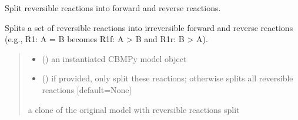 \documentclass[letterpaper,12pt,english]{sphinxmanual}
\begin{document}
\begin{fulllineitems}
\label{\detokenize{api/core:cbmpy.CBTools.splitReversibleReactions}}
\pysigstartsignatures
\pysiglinewithargsret
{}
{\sphinxparamcomma {}}
{}
\pysigstopsignatures
\sphinxAtStartPar
Split reversible reactions into forward and reverse reactions.

\sphinxAtStartPar
Splits a set of reversible reactions into irreversible forward and reverse
reactions (e.g., R1: A = B becomes R1f: A \sphinxhyphen{}\textgreater{} B and R1r: B \sphinxhyphen{}\textgreater{} A).
\begin{quote}\begin{description}
\begin{itemize}
\item {} 
\sphinxAtStartPar
{} () \textendash{} an instantiated CBMPy model object

\item {} 
\sphinxAtStartPar
{} (\sphinxstyleliteralemphasis{\sphinxupquote{, }}) \textendash{} if provided, only split these reactions;
otherwise splits all reversible reactions {[}default=None{]}

\end{itemize}

\sphinxAtStartPar
{} \textendash{} a clone of the original model with reversible reactions split

\end{description}\end{quote}

\end{fulllineitems}

\end{document}
